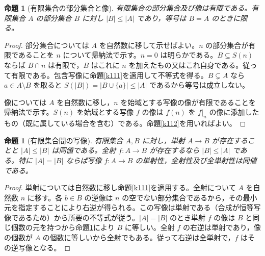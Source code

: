 \documentclass[a5paper,10pt,dvipdfmx]{jsarticle}
\theoremstyle{definition}
\theoremstyle{plain}
\newtheorem{prop}[ruledef]{命題}
\begin{document}
\begin{prop}[有限集合の部分集合と像]\label{k113}
有限集合の部分集合及び像は有限である。有限集合 $A$ の部分集合 $B$ に対し $|B|\leq |A|$ であり，等号は $B=A$ のときに限る。
\end{prop}
\begin{proof}
部分集合については $A$ を自然数に移して示せばよい。$n$ の部分集合が有限であることを $n$ について帰納法で示す。$n=0$ は明らかである。$B\subseteq S(n)$ ならば $B\cap n$ は有限で，$B$ はこれに $n$ を加えたもの又はこれ自身である。従って有限である。包含写像に命題\ref{k111}を適用して不等式を得る。$B\subsetneq A$ なら $a\in A\setminus B$ を取ると $S(|B|)=|B\cup\{a\}|\leq |A|$ であるから等号は成立しない。

像については $A$ を自然数に移し，$n$ を始域とする写像の像が有限であることを帰納法で示す。$S(n)$ を始域とする写像 $f$ の像は $f(n)$ を $f|_n$ の像に添加したもの（既に属している場合を含む）である。命題\ref{k112}を用いればよい。
\end{proof}
\begin{prop}[有限集合間の写像]\label{k114}
有限集合 $A,B$ に対し，単射 $A\to B$ が存在することと $|A|\leq |B|$ は同値である。全射 $f\colon A\to B$ が存在するなら $|B|\leq |A|$ である。特に $|A|=|B|$ ならば写像 $f\colon A\to B$ の単射性，全射性及び全単射性は同値である。
\end{prop}
\begin{proof}
単射については自然数に移し命題\ref{k111}を適用する。全射について $A$ を自然数 $n$ に移す。各 $b\in B$ の逆像は $n$ の空でない部分集合であるから，その最小元を指定することにより右逆が得られる。この写像は単射である（合成が恒等写像であるため）から所要の不等式が従う。$|A|=|B|$ のとき単射 $f$ の像は $B$ と同じ個数の元を持つから命題\ref{k113}により $B$ に等しい。全射 $f$ の右逆は単射であり，像の個数が $A$ の個数に等しいから全射でもある。従って右逆は全単射で，$f$ はその逆写像となる。
\end{proof}
\end{document}
